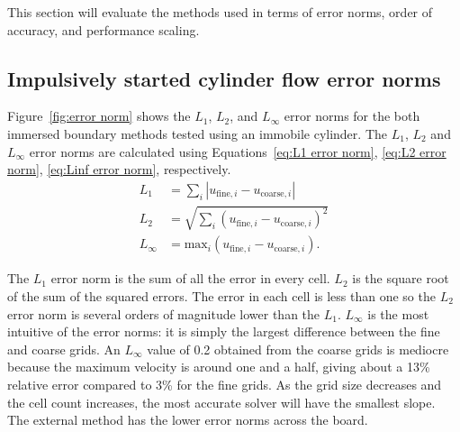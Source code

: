 \documentclass[preprint,12pt]{elsarticle}
\begin{document}
This section will evaluate the methods used in terms of error norms, order of accuracy, and performance scaling.

\subsection{Impulsively started cylinder flow error norms}
Figure~\ref{fig:error norm} shows the $L_1$, $L_2$, and $L_\infty$ error norms for the both immersed boundary methods tested using an immobile cylinder.
The $L_1$, $L_2$ and $L_\infty$ error norms are calculated using Equations~\eqref{eq:L1 error norm}, \eqref{eq:L2 error norm}, \eqref{eq:Linf error norm}, respectively.
\begin{align}
L_1 &= \sum_{i} \left|u_{\text{fine}, i}-u_{\text{coarse},i}\right| \label{eq:L1 error norm} \\
L_2 &= \sqrt{\sum_{i} \left(u_{\text{fine}, i}-u_{\text{coarse},i}\right)^2} \label{eq:L2 error norm} \\
L_{\infty} &= \text{max}_i\left(u_{\text{fine}, i}-u_{\text{coarse},i}\right) .\ \label{eq:Linf error norm}
\end{align}

The $L_1$ error norm is the sum of all the error in every cell.
$L_2$ is the square root of the sum of the squared errors.
The error in each cell is less than one so the $L_2$ error norm is several orders of magnitude lower than the $L_1$.
$L_\infty$ is the most intuitive of the error norms: it is simply the largest difference between the fine and coarse grids.
An $L_\infty$ value of 0.2 obtained from the coarse grids is mediocre because the maximum velocity is around one and a half, giving about a 13\% relative error compared to 3\% for the fine grids.
As the grid size decreases and the cell count increases, the most accurate solver will have the smallest slope.
The external method has the lower error norms across the board.
\end{document}
